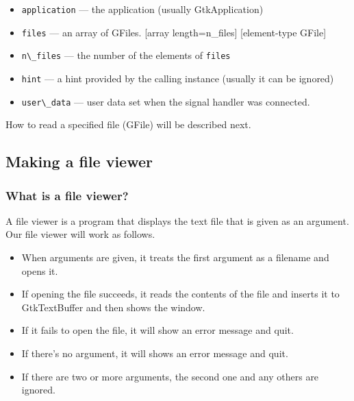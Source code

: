 \begin{itemize}
\tightlist
\item
  \passthrough{\lstinline!application!} --- the application (usually
  GtkApplication)
\item
  \passthrough{\lstinline!files!} --- an array of GFiles. {[}array
  length=n\_files{]} {[}element-type GFile{]}
\item
  \passthrough{\lstinline!n\_files!} --- the number of the elements of
  \passthrough{\lstinline!files!}
\item
  \passthrough{\lstinline!hint!} --- a hint provided by the calling
  instance (usually it can be ignored)
\item
  \passthrough{\lstinline!user\_data!} --- user data set when the signal
  handler was connected.
\end{itemize}

How to read a specified file (GFile) will be described next.

\hypertarget{making-a-file-viewer}{%
\subsection{Making a file viewer}\label{making-a-file-viewer}}

\hypertarget{what-is-a-file-viewer}{%
\subsubsection{What is a file viewer?}\label{what-is-a-file-viewer}}

A file viewer is a program that displays the text file that is given as
an argument. Our file viewer will work as follows.

\begin{itemize}
\tightlist
\item
  When arguments are given, it treats the first argument as a filename
  and opens it.
\item
  If opening the file succeeds, it reads the contents of the file and
  inserts it to GtkTextBuffer and then shows the window.
\item
  If it fails to open the file, it will show an error message and quit.
\item
  If there's no argument, it will shows an error message and quit.
\item
  If there are two or more arguments, the second one and any others are
  ignored.
\end{itemize}

